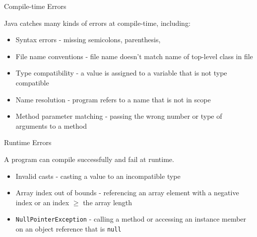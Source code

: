 \documentclass{beamer}
\begin{document}
\begin{frame}[fragile]{Compile-time Errors}


Java catches many kinds of errors at compile-time, including:
\begin{itemize}
\item Syntax errors - missing semicolons, parenthesis,
\item File name conventions - file name doesn't match name of top-level class in file
\item Type compatibility - a value is assigned to a variable that is not type compatible
\item Name resolution - program refers to a name that is not in scope
\item Method parameter matching - passing the wrong number or type of arguments to a method
\end{itemize}

\end{frame}

\begin{frame}[fragile]{Runtime Errors}


A program can compile successfully and fail at runtime.
\begin{itemize}
\item Invalid casts - casting a value to an incompatible type
\item Array index out of bounds - referencing an array element with a negative index or an index $\ge$ the array length
\item {\tt NullPointerException} - calling a method or accessing an instance member on an object reference that is {\tt null}
\end{itemize}

\end{frame}
\end{document}
